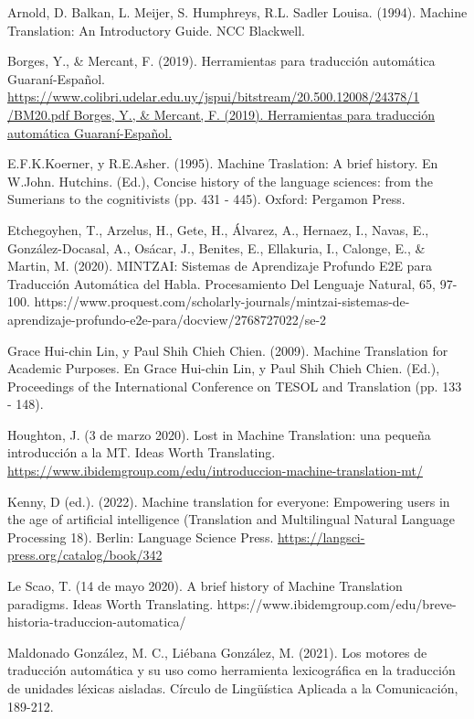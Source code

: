 \documentclass[conference]{IEEEtran}
\begin{document}
\begin{thebibliography}{00}
Arnold, D. Balkan, L. Meijer, S. Humphreys, R.L. Sadler Louisa. (1994). Machine Translation: An Introductory Guide. NCC Blackwell.

 Borges, Y., & Mercant, F. (2019). Herramientas para traducción automática Guaraní-Español.
\url{https://www.colibri.udelar.edu.uy/jspui/bitstream/20.500.12008/24378/1
/BM20.pdf  Borges, Y., & Mercant, F. (2019). Herramientas 
para traducción automática Guaraní-Español.}

E.F.K.Koerner, y  R.E.Asher. (1995). Machine Traslation: A brief history. En W.John. Hutchins. (Ed.), Concise history of the language sciences: from the Sumerians to the cognitivists (pp. 431 - 445). Oxford: Pergamon Press.

Etchegoyhen, T., Arzelus, H., Gete, H., Álvarez, A., Hernaez, I., Navas, E., González-Docasal, A., Osácar, J., Benites, E., Ellakuria, I., Calonge, E., & Martin, M. (2020). MINTZAI: Sistemas de Aprendizaje Profundo E2E para Traducción Automática del Habla. Procesamiento Del Lenguaje Natural, 65, 97-100. https://www.proquest.com/scholarly-journals/mintzai-sistemas-de-aprendizaje-profundo-e2e-para/docview/2768727022/se-2


 Grace Hui-chin Lin, y Paul Shih Chieh Chien. (2009). Machine Translation for Academic Purposes. En Grace Hui-chin Lin, y Paul Shih Chieh Chien. (Ed.), Proceedings of the International Conference on TESOL and Translation (pp. 133 - 148). 

Houghton, J. (3 de marzo 2020). Lost in Machine Translation: una pequeña introducción a la MT. Ideas Worth Translating. 
\url{https://www.ibidemgroup.com/edu/introduccion-machine-translation-mt/}

Kenny, D (ed.). (2022). Machine translation for everyone: Empowering users in the age of artificial intelligence (Translation and Multilingual Natural Language Processing 18). Berlin: Language Science Press. \url{https://langsci-press.org/catalog/book/342}

Le Scao, T. (14 de mayo 2020). A brief history of Machine Translation paradigms. Ideas Worth Translating. https://www.ibidemgroup.com/edu/breve-historia-traduccion-automatica/

Maldonado González, M. C., Liébana González, M. (2021). Los motores de traducción automática y su uso como herramienta lexicográfica en la traducción de unidades léxicas aisladas. Círculo de Lingüística Aplicada a la Comunicación, 189-212.


\end{thebibliography}
\end{document}
